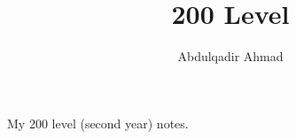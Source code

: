 \documentclass{article}
\title{200 Level}
\author{Abdulqadir Ahmad}
\begin{document}
\maketitle
\tableofcontents

My 200 level (second year) notes.
\end{document}
